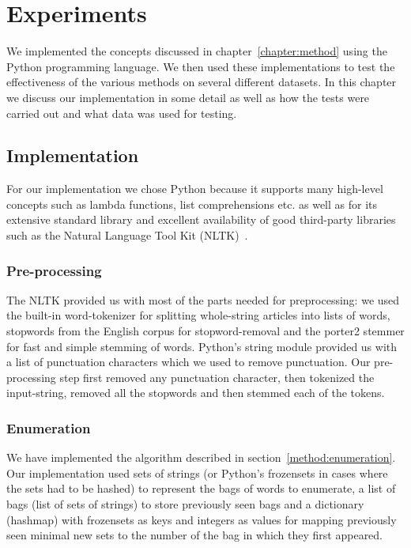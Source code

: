 \chapter{Experiments}
\label{chapter:experiments}

We implemented the concepts discussed in chapter~\ref{chapter:method} using the Python programming language. We then used these implementations to test the effectiveness of the various methods on several different datasets. In this chapter we discuss our implementation in some detail as well as how the tests were carried out and what data was used for testing.

\section{Implementation}
For our implementation we chose Python because it supports many high-level concepts such as lambda functions, list comprehensions etc. as well as for its extensive standard library and excellent availability of good third-party libraries such as the Natural Language Tool Kit (NLTK)~\cite{nltk}.

\subsection{Pre-processing}
The NLTK provided us with most of the parts needed for preprocessing: we used the built-in word-tokenizer for splitting whole-string articles into lists of words,  stopwords from the English corpus for stopword-removal and the porter2 stemmer for fast and simple stemming of words. Python's string module provided us with a list of punctuation characters which we used to remove punctuation. Our pre-processing step first removed any punctuation character, then tokenized the input-string, removed all the stopwords and then stemmed each of the tokens.

\subsection{Enumeration}
We have implemented the algorithm described in section~\ref{method:enumeration}. Our implementation used sets of strings (or Python's frozensets in cases where the sets had to be hashed) to represent the bags of words to enumerate, a list of bags (list of sets of strings) to store previously seen bags and a dictionary (hashmap) with frozensets as keys and integers as values for mapping previously seen minimal new sets to the number of the bag in which they first appeared. %


